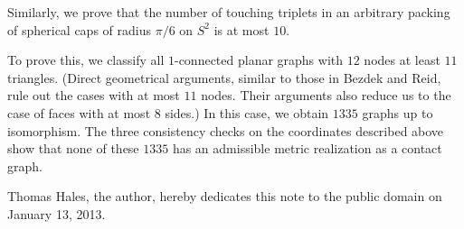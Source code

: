 Similarly, we prove that the number of touching triplets in an
arbitrary packing of spherical caps of radius $\pi/6$ on $S^2$ is at
most $10$.

To prove this, we classify all $1$-connected planar graphs with $12$
nodes at least $11$ triangles.  (Direct geometrical arguments, similar
to those in Bezdek and Reid, rule out the cases with at most $11$
nodes.  Their arguments also reduce us to the case of faces with at
most $8$ sides.)  In this case, we obtain $1335$ graphs up to
isomorphism.  The three consistency checks on the coordinates
described above show that none of these $1335$ has an admissible
metric realization as a contact graph.


Thomas Hales, the author, hereby dedicates this note to the public
domain on January 13, 2013.


